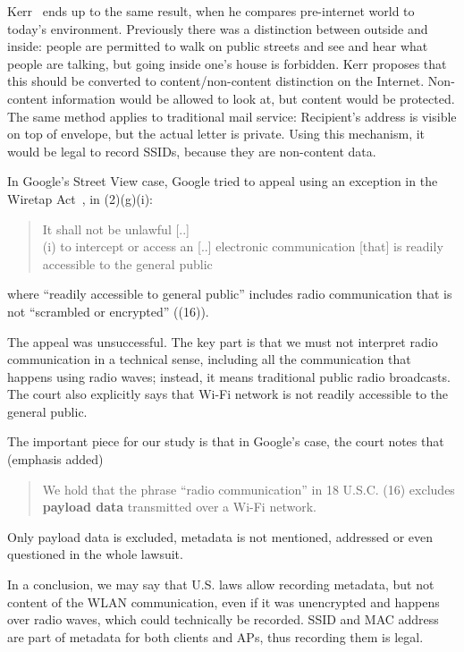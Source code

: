\documentclass[12pt,a4paper,oneside,pdftex]{report}
\begin{document}
Kerr~\cite{kerr2009applying} ends up to the same result, when he compares pre-internet world to today's environment. Previously there was a distinction between outside and inside: people are permitted to walk on public streets and see and hear what people are talking, but going inside one's house is forbidden. Kerr proposes that this should be converted to content/non-content distinction on the Internet. Non-content information would be allowed to look at, but content would be protected. The same method applies to traditional mail service: Recipient's address is visible on top of envelope, but the actual letter is private. Using this mechanism, it would be legal to record SSIDs, because they are non-content data.

In Google's Street View case, Google tried to appeal using an exception in the Wiretap Act~\cite{google_joffe}, in (2)(g)(i):

\begin{quote}
    It shall not be unlawful [..] \\
    (i) to intercept or access an [..] electronic communication [that] is readily accessible to the general public
\end{quote}
where ``readily accessible to general public'' includes radio communication that is not ``scrambled or encrypted'' ((16)). 

The appeal was unsuccessful. The key part is that we must not interpret radio communication in a technical sense, including all the communication that happens using radio waves; instead, it means traditional public radio broadcasts. The court also explicitly says that Wi-Fi network is not readily accessible to the general public.

The important piece for our study is that in Google's case, the court notes that~\cite{google_joffe} (emphasis added)

\begin{quote}
    We hold that the phrase ``radio communication'' in 18 U.S.C. (16) excludes \textbf{payload data} transmitted over a Wi-Fi network.
\end{quote}
Only payload data is excluded, metadata is not mentioned, addressed or even questioned in the whole lawsuit.

In a conclusion, we may say that U.S. laws allow recording metadata, but not content of the WLAN communication, even if it was unencrypted and happens over radio waves, which could technically be recorded. SSID and MAC address are part of metadata for both clients and APs, thus recording them is legal.
\end{document}
